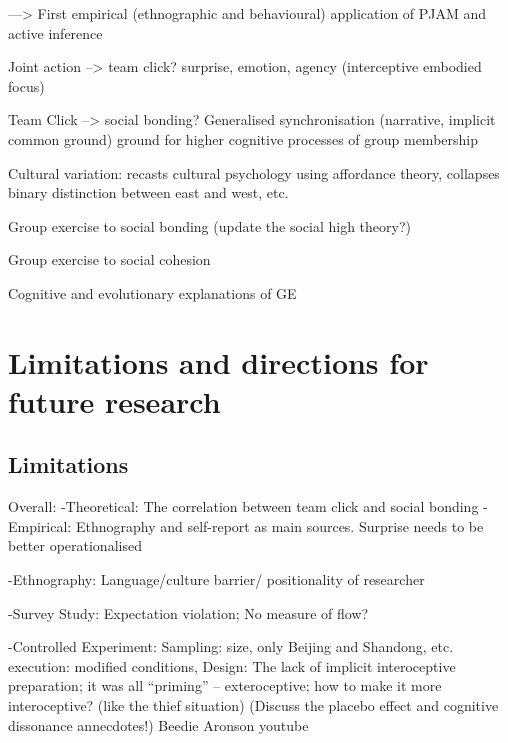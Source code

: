 ---> First empirical (ethnographic and behavioural) application of PJAM and active inference

Joint action --> team click?
surprise, emotion, agency (interceptive embodied focus)

Team Click --> social bonding?
Generalised synchronisation (narrative, implicit common ground)
ground for higher cognitive processes of group membership

Cultural variation:
recasts cultural psychology using affordance theory, collapses binary distinction between east and west, etc.



Group exercise to social bonding (update the social high theory?)

Group exercise to social cohesion

Cognitive and evolutionary explanations of GE





\section{Limitations and directions for future research}

\subsection{Limitations}
Overall:
-Theoretical:
    The correlation between team click and social bonding
-Empirical:
  Ethnography and self-report as main sources.
  Surprise needs to be better operationalised

-Ethnography:
    Language/culture barrier/ positionality of researcher


-Survey Study:
    Expectation violation;
    No measure of flow?

-Controlled Experiment:
    Sampling: size, only Beijing and Shandong, etc.
    execution: modified conditions,
    Design: The lack of implicit interoceptive preparation; it was all ``priming'' -- exteroceptive; how to make it more interoceptive? (like the thief situation)
    (Discuss the placebo effect and cognitive dissonance annecdotes!)
    Beedie
    Aronson youtube



